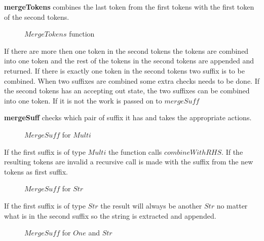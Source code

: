 \textbf{mergeTokens} combines the last token from the first tokens with
the first token of the second tokens.

\begin{figure}[h!]
  
  \caption{$MergeTokens$ function \label{fig:mergetokens}}
\end{figure}
If there are more then one token in the second tokens the tokens are combined
into one token and the rest of the tokens in the second tokens are appended and
returned. If there is exactly one token in the second tokens two suffix is to be
combined. When two suffixes are combined some extra checks needs to be done.
If the second tokens has an accepting out state, the two suffixes can be
combined into one token. If it is not the work is passed on to $mergeSuff$

\textbf{mergeSuff} checks which pair of suffix it has and takes the appropriate
actions.

\begin{figure}[h!]
  
  \caption{$MergeSuff$ for $Multi$ \label{fig:msmulti}}
\end{figure}

If the first suffix is of type $Multi$ the function calls $combineWithRHS$. If
the resulting tokens are invalid a recursive call is made with the suffix from
the new tokens as first suffix.

\begin{figure}[h!]
  
  \caption{$MergeSuff$ for $Str$ \label{fig:msstr}}
\end{figure}

If the first suffix is of type $Str$ the result will always be another $Str$ no
matter what is in the second suffix so the string is extracted and appended.

\begin{figure}[h!]
  
  \caption{$MergeSuff$ for $One$ and $Str$ \label{fig:msonestr}}
\end{figure}

